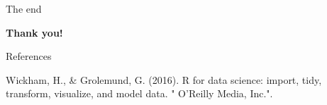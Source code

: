 \documentclass[
  ignorenonframetext,
]{beamer}
\begin{document}
\begin{frame}{The end}
\protect\hypertarget{the-end}{}

\begin{center}
\textbf{Thank you!}
\end{center}

\end{frame}

\begin{frame}{References}
\protect\hypertarget{references}{}

\begin{thebibliography}{99}
Wickham, H., \& Grolemund, G. (2016). R for data science: import, tidy, transform, visualize, and model data. " O'Reilly Media, Inc.".
\end{thebibliography}

\end{frame}
\end{document}
